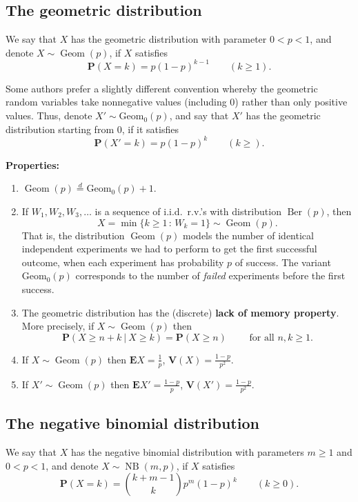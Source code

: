 \documentclass[12pt]{article}
\newcommand{\prob}{\mathbf{P}}
\newcommand{\expec}{\mathbf{E}}
\newcommand{\var}{\mathbf{V}}
\newcommand{\eqdist}{\stackrel{d}{=}}
\newcommand{\berdist}{\operatorname{Ber}}
\newcommand{\geomdist}{\operatorname{Geom}}
\newcommand{\geomzdist}{\operatorname{Geom_0}}
\newcommand{\nbdist}{\operatorname{NB}}
\theoremstyle{example}
\begin{document}
\subsection{The geometric distribution}

We say that $X$ has the geometric distribution with parameter $0<p<1$, and denote $X\sim \geomdist(p)$, if $X$ satisfies
$$
\prob(X=k) = p(1-p)^{k-1} \qquad (k \ge 1).
$$

Some authors prefer a slightly different convention whereby the geometric random variables take nonnegative values (including $0$) rather than only positive values. Thus, denote $X' \sim \geomzdist(p)$, and say that $X'$ has the geometric distribution starting from $0$, if it satisfies
$$
\prob(X'=k) = p(1-p)^{k} \qquad (k \ge ).
$$

\noindent \textbf{Properties:}
\begin{enumerate}
\item $\geomdist(p) \eqdist \geomzdist(p) + 1$.
\item If $W_1,W_2,W_3, \ldots$ is a sequence of i.i.d.\ r.v.'s with distribution $\berdist(p)$, then
$$ X = \min\{ k\ge 1\,:\, W_k = 1\}  \sim \geomdist(p). $$
That is, the distribution $\geomdist(p)$ models the number of identical independent experiments we had to perform to get the first successful outcome, when each experiment has probability $p$ of success. The variant $\geomzdist(p)$ corresponds to the number of \emph{failed} experiments before the first success.
\item The geometric distribution has the (discrete) \textbf{lack of memory property}. More precisely, if $X \sim \geomdist(p)$ then
$$ \prob(X \ge n+k \ |\ X \ge k) = \prob(X \ge n)\qquad \textrm{ for all $n,k\ge 1$}.$$
\item If $X\sim \geomdist(p)$ then $\expec X = \frac1p$, $\var(X) = \frac{1-p}{p^2}$.
\item If $X'\sim \geomdist(p)$ then $\expec X' = \frac{1-p}{p}$, $\var(X') = \frac{1-p}{p^2}$.
\end{enumerate}



\subsection{The negative binomial distribution}

We say that $X$ has the negative binomial distribution with parameters $m\ge1$ and $0<p<1$, and denote $X\sim \nbdist(m,p)$, if $X$ satisfies
$$
\prob(X=k) = \binom{k+m-1}{k} p^m (1-p)^k \qquad (k\ge 0).
$$
\end{document}
